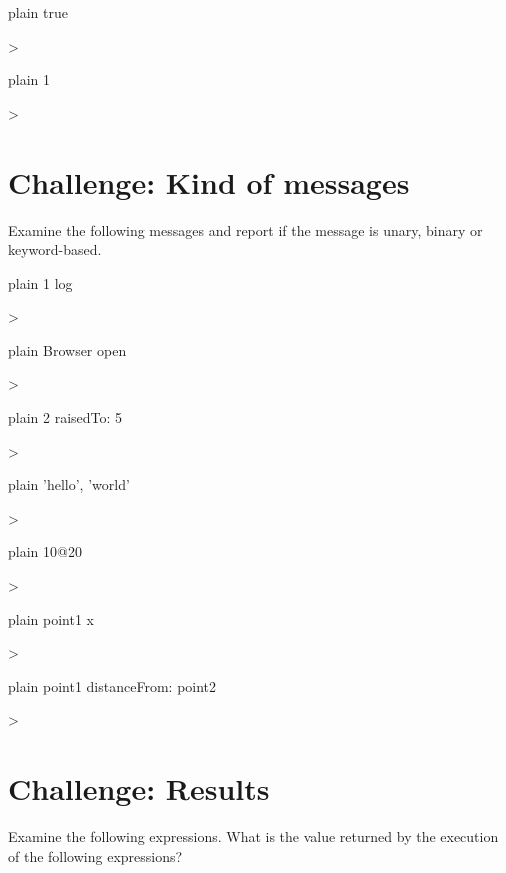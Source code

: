 \documentclass[10pt,twoside,english]{_support/latex/sbabook/sbabook}
\begin{document}

\begin{displaycode}{plain}
true

>
\end{displaycode}

\begin{displaycode}{plain}
1

>
\end{displaycode}
\section{Challenge: Kind of messages}
Examine the following messages and report if the message is unary, binary or keyword-based.

\begin{displaycode}{plain}
1 log

>
\end{displaycode}

\begin{displaycode}{plain}
Browser open

>
\end{displaycode}

\begin{displaycode}{plain}
2 raisedTo: 5

>
\end{displaycode}

\begin{displaycode}{plain}
'hello', 'world'

>
\end{displaycode}

\begin{displaycode}{plain}
10@20

>
\end{displaycode}

\begin{displaycode}{plain}
point1 x

> 
\end{displaycode}

\begin{displaycode}{plain}
point1 distanceFrom: point2

>
\end{displaycode}
\section{Challenge: Results}
Examine the following expressions. What is the value returned by the execution of the following expressions?
\end{document}

